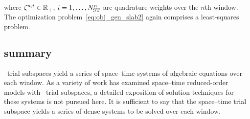 where $\zeta^{n,i} \in \mathbb{R}^{}_{+}$, $i=1,\ldots,N_{\text{ST}}^{n}$ are quadrature weights over the $n$th window. The optimization problem~\eqref{eq:obj_gen_slab2} again comprises a least-squares problem.
\subsection{\spaceTimeAcronym\: summary}
\spaceTimeAcronym\ trial subspaces yield a series of space--time systems of algebraic equations over each window. As a variety of work has examined space--time reduced-order models with \spaceTimeAcronym\ trial subspaces, 
a detailed exposition of solution techniques for these systems is not pursued here. It is sufficient to say that the 
space--time trial subspace yields a series of dense systems to be solved over each window.
